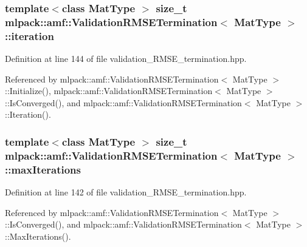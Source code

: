 \subsubsection[{iteration}]{\setlength{\rightskip}{0pt plus 5cm}template$<$class Mat\-Type $>$ size\-\_\-t {\bf mlpack\-::amf\-::\-Validation\-R\-M\-S\-E\-Termination}$<$ Mat\-Type $>$\-::iteration\hspace{0.3cm}{\ttfamily [private]}}\label{classmlpack_1_1amf_1_1ValidationRMSETermination_af078313ea13a6a640428cd71d5ee476d}


Definition at line 144 of file validation\-\_\-\-R\-M\-S\-E\-\_\-termination.\-hpp.



Referenced by mlpack\-::amf\-::\-Validation\-R\-M\-S\-E\-Termination$<$ Mat\-Type $>$\-::\-Initialize(), mlpack\-::amf\-::\-Validation\-R\-M\-S\-E\-Termination$<$ Mat\-Type $>$\-::\-Is\-Converged(), and mlpack\-::amf\-::\-Validation\-R\-M\-S\-E\-Termination$<$ Mat\-Type $>$\-::\-Iteration().

\subsubsection[{max\-Iterations}]{\setlength{\rightskip}{0pt plus 5cm}template$<$class Mat\-Type $>$ size\-\_\-t {\bf mlpack\-::amf\-::\-Validation\-R\-M\-S\-E\-Termination}$<$ Mat\-Type $>$\-::max\-Iterations\hspace{0.3cm}{\ttfamily [private]}}\label{classmlpack_1_1amf_1_1ValidationRMSETermination_ae7ab2e014d372e9156af93ad38b68629}


Definition at line 142 of file validation\-\_\-\-R\-M\-S\-E\-\_\-termination.\-hpp.



Referenced by mlpack\-::amf\-::\-Validation\-R\-M\-S\-E\-Termination$<$ Mat\-Type $>$\-::\-Is\-Converged(), and mlpack\-::amf\-::\-Validation\-R\-M\-S\-E\-Termination$<$ Mat\-Type $>$\-::\-Max\-Iterations().

